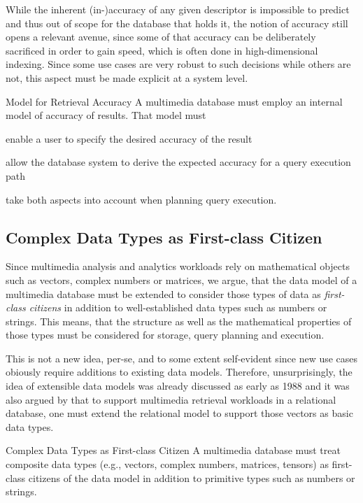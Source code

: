 While the inherent (in-)accuracy of any given descriptor is impossible to predict and thus out of scope for the database that holds it, the notion of accuracy still opens a relevant avenue, since some of that accuracy can be deliberately sacrificed in order to gain speed, which is often done in high-dimensional indexing. Since some use cases are very robust to such decisions while others are not, this aspect must be made explicit at a system level.

\begin{requirement}[label=requirement:accuracy_model]{Model for Retrieval Accuracy}{}
    A multimedia database must employ an internal model of accuracy of results. That model must
    \begin{enumerate*}[label=(\roman*)]
        \item enable a user to specify the desired accuracy of the result
        \item allow the database system to derive the expected accuracy for a query execution path
        \item take both aspects into account when planning query execution.
    \end{enumerate*}
\end{requirement}

\subsection{Complex Data Types as First-class Citizen}
Since multimedia analysis and analytics workloads rely on mathematical objects such as vectors, complex numbers or matrices, we argue, that the data model of a multimedia database must be extended to consider those types of data as \emph{first-class citizens} in addition to well-established data types such as numbers or strings. This means, that the structure as well as the mathematical properties of those types must be considered for storage, query planning and execution.

This is not a new idea, per-se, and to some extent self-evident since new use cases obiously require additions to existing data models. Therefore, unsurprisingly, the idea of extensible data models was already discussed as early as 1988 \cite{Linnemann:1988Design} and it was also argued by \cite{Giangreco:2018Database} that to support multimedia retrieval workloads in a relational database, one must extend the relational model to support those vectors as basic data types. 

\begin{requirement}[label=requirement:complex_data_types]{Complex Data Types as First-class Citizen}{}
    A multimedia database must treat composite data types (e.g., vectors, complex numbers, matrices, tensors) as first-class citizens of the data model in addition to primitive types such as numbers or strings.
\end{requirement}


